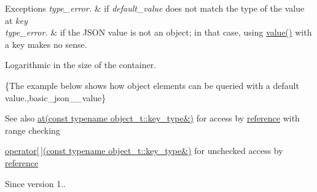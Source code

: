 \begin{DoxyExceptions}{Exceptions}
{\em type\+\_\+error.} & if {\itshape default\+\_\+value} does not match the type of the value at {\itshape key} \\
\hline
{\em type\+\_\+error.} & if the J\+S\+ON value is not an object; in that case, using {\ttfamily \hyperlink{classnlohmann_1_1basic__json_ac9e014095170d72c4c57e3daf8efc059}{value()}} with a key makes no sense.\\
\hline
\end{DoxyExceptions}
Logarithmic in the size of the container.

\{The example below shows how object elements can be queried with a default value.,basic\+\_\+json\+\_\+\+\_\+value\}

\begin{DoxySeeAlso}{See also}
\hyperlink{classnlohmann_1_1basic__json_a239e942da82f2597d0cf5ec806f5bc0d}{at(const typename object\+\_\+t\+::key\+\_\+type\&)} for access by \hyperlink{classnlohmann_1_1basic__json_a220ae98554a76205fb7f8822d36b2d5a}{reference} with range checking 

\hyperlink{classnlohmann_1_1basic__json_a3f45f3820c456ad2e3f3df2926564151}{operator\mbox{[}$\,$\mbox{]}(const typename object\+\_\+t\+::key\+\_\+type\&)} for unchecked access by \hyperlink{classnlohmann_1_1basic__json_a220ae98554a76205fb7f8822d36b2d5a}{reference}
\end{DoxySeeAlso}
\begin{DoxySince}{Since}
version 1.. 
\end{DoxySince}
